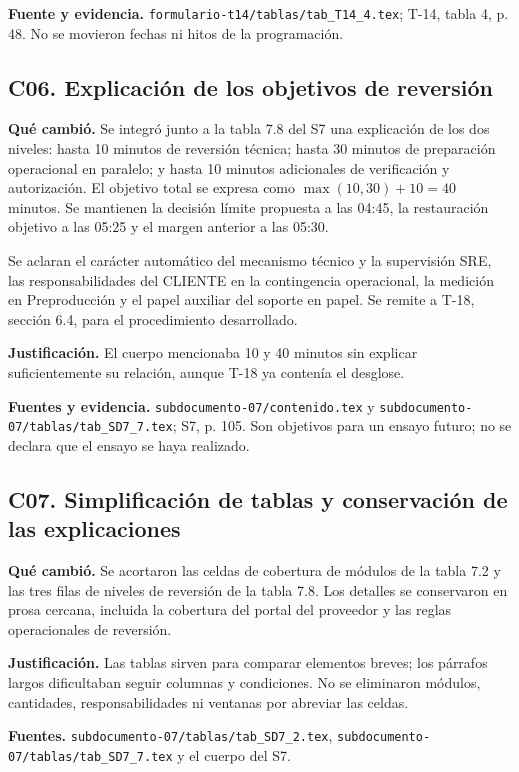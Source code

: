 \documentclass[11pt,letterpaper]{article}
\newcommand{\ruta}[1]{\nolinkurl{#1}}
\begin{document}
\textbf{Fuente y evidencia.} \ruta{formulario-t14/tablas/tab_T14_4.tex};
T-14, tabla 4, p. 48. No se movieron fechas ni hitos de la programación.

\subsection{C06. Explicación de los objetivos de reversión}
\textbf{Qué cambió.} Se integró junto a la tabla 7.8 del S7 una explicación de
los dos niveles: hasta 10 minutos de reversión técnica; hasta 30 minutos de
preparación operacional en paralelo; y hasta 10 minutos adicionales de
verificación y autorización. El objetivo total se expresa como
\(\max(10,30)+10=40\) minutos. Se mantienen la decisión límite propuesta a las
04:45, la restauración objetivo a las 05:25 y el margen anterior a las 05:30.

Se aclaran el carácter automático del mecanismo técnico y la supervisión SRE,
las responsabilidades del CLIENTE en la contingencia operacional, la medición en
Preproducción y el papel auxiliar del soporte en papel. Se remite a T-18,
sección 6.4, para el procedimiento desarrollado.

\textbf{Justificación.} El cuerpo mencionaba 10 y 40 minutos sin explicar
suficientemente su relación, aunque T-18 ya contenía el desglose.

\textbf{Fuentes y evidencia.} \ruta{subdocumento-07/contenido.tex} y
\ruta{subdocumento-07/tablas/tab_SD7_7.tex}; S7, p. 105.
Son objetivos para un ensayo futuro; no se declara que el ensayo se haya realizado.

\subsection{C07. Simplificación de tablas y conservación de las explicaciones}
\textbf{Qué cambió.} Se acortaron las celdas de cobertura de módulos de la tabla
7.2 y las tres filas de niveles de reversión de la tabla 7.8. Los detalles se
conservaron en prosa cercana, incluida la cobertura del portal del proveedor y
las reglas operacionales de reversión.

\textbf{Justificación.} Las tablas sirven para comparar elementos breves; los
párrafos largos dificultaban seguir columnas y condiciones. No se eliminaron
módulos, cantidades, responsabilidades ni ventanas por abreviar las celdas.

\textbf{Fuentes.} \ruta{subdocumento-07/tablas/tab_SD7_2.tex},
\ruta{subdocumento-07/tablas/tab_SD7_7.tex} y el cuerpo del S7.
\end{document}
